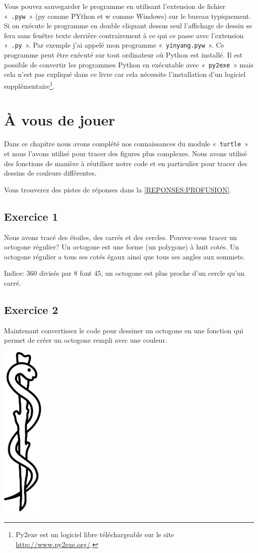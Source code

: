 Vous pouvez sauvegarder le programme en utilisant l'extension de fichier «~\texttt{.pyw}~» (py comme PYthon et w comme Windows) sur le bureau typiquement. Si on exécute le programme en double cliquant dessus seul l'affichage de dessin se fera sans fenêtre texte derrière contrairement à ce qui ce passe avec l'extension «~\texttt{.py}~». Par exemple j'ai appelé mon programme «~\texttt{yinyang.pyw}~». Ce programme peut être exécuté sur tout ordinateur où Python est installé. Il est possible de convertir les programmes Python en exécutable avec «~\texttt{py2exe}~» mais cela n'est pas expliqué dans ce livre car cela nécessite l'installation d'un logiciel supplémentaire\footnote{Py2exe est un logiciel libre téléchargeable sur le site \url{http://www.py2exe.org/}.}.


\section{À vous de jouer\label{PRATIQUE:PROFUSION}}

Dans ce chapitre nous avons complété nos connaissances du module «~\texttt{turtle}~» et nous l'avons utilisé pour tracer des figures plus complexes. Nous avons utilisé des fonctions de manière à réutiliser notre code et en particulier pour tracer des dessins de couleurs différentes.

Vous trouverez des pistes de réponses dans la \autoref{REPONSES:PROFUSION}.


\subsection{Exercice 1}
Nous avons tracé des étoiles, des carrés et des cercles. Pouvez-vous tracer un octogone régulier? Un octogone est une forme (un polygone) à huit cotés. Un octogone régulier a tous ses cotés égaux ainsi que tous ses angles aux sommets.

Indice: 360 divisés par 8 font 45, un octogone est plus proche d'un cercle qu'un carré.

\subsection{Exercice 2}
Maintenant convertissez le code pour dessiner un octogone en une fonction qui permet de créer un octogone rempli avec une couleur.


 \vfill
\begin{center}
 \includegraphics[width=2cm]{images/Esclapius_stick.pdf}
\end{center}
 \vfill

